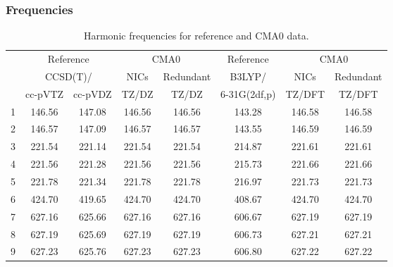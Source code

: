 \documentclass[10pt,oneside]{article}
\begin{document}
\begin{table}[h!]
\subsubsection*{Frequencies}
\centering
\caption{Harmonic frequencies for reference and CMA0 data.}
\begin{tabular}{cccccccc}
\toprule
{} & \multicolumn{2}{c}{Reference} & \multicolumn{2}{c}{CMA0} &    Reference & \multicolumn{2}{c}{CMA0} \\
{} & \multicolumn{2}{c}{CCSD(T)/} &   NICs &  Redundant &       B3LYP/ &   NICs & Redundant \\
{} &   cc-pVTZ & cc-pVDZ &  TZ/DZ &      TZ/DZ & 6-31G(2df,p) & TZ/DFT &    TZ/DFT \\
\midrule
1 &    146.56 &  147.08 & 146.56 &     146.56 &       143.28 & 146.58 &    146.58 \\
2 &    146.57 &  147.09 & 146.57 &     146.57 &       143.55 & 146.59 &    146.59 \\
3 &    221.54 &  221.14 & 221.54 &     221.54 &       214.87 & 221.61 &    221.61 \\
4 &    221.56 &  221.28 & 221.56 &     221.56 &       215.73 & 221.66 &    221.66 \\
5 &    221.78 &  221.34 & 221.78 &     221.78 &       216.97 & 221.73 &    221.73 \\
6 &    424.70 &  419.65 & 424.70 &     424.70 &       408.67 & 424.70 &    424.70 \\
7 &    627.16 &  625.66 & 627.16 &     627.16 &       606.67 & 627.19 &    627.19 \\
8 &    627.19 &  625.69 & 627.19 &     627.19 &       606.73 & 627.21 &    627.21 \\
9 &    627.23 &  625.76 & 627.23 &     627.23 &       606.80 & 627.22 &    627.22 \\
\bottomrule
\end{tabular}
\end{table}
\end{document}
